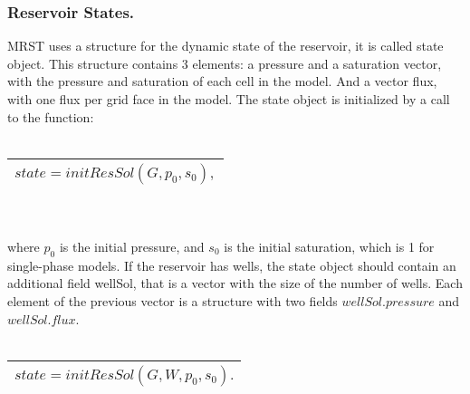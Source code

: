 \documentclass[a4paper,10pt]{report}
\begin{document}
\subsubsection{Reservoir States.}
MRST uses a structure for the dynamic state of the reservoir, it is called state object.
This structure contains 3 elements: a pressure and a saturation vector,
with the pressure and saturation of each cell in the model. And a vector flux, with one 
flux per grid face in the model.
The state object is initialized by a call to the function:\\\\
\begin{tabular}{|l|}
\hline
 $state=initResSol(G,p_0,s_0),$\\
\hline
\end{tabular}
\\\\where $p_0$ is the initial pressure, and $s_0$ is the initial saturation, 
which is 1 for single-phase models.
If the reservoir has wells, the state object should contain an additional field wellSol, 
that is a vector with
the size of the number of wells. Each element of the previous vector is a structure with two 
fields $wellSol.pressure$ and $wellSol.flux$. 
\\\\
\begin{tabular}{|l|}
\hline
 $state=initResSol(G,W,p_0,s_0).$\\
\hline
\end{tabular}
\end{document}
